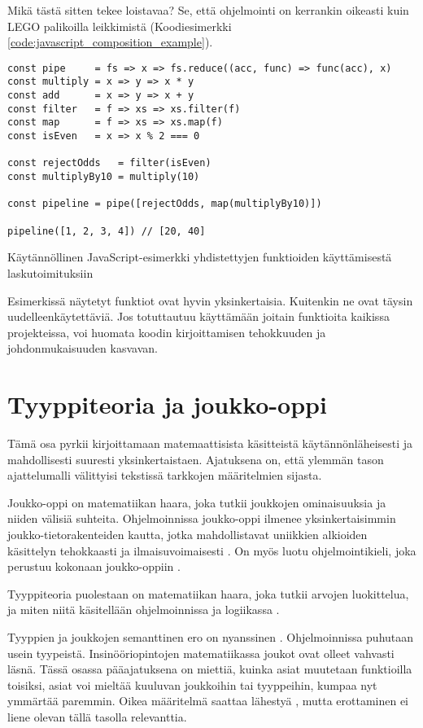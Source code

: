 Mikä tästä sitten tekee loistavaa? Se, että ohjelmointi on kerrankin oikeasti kuin LEGO palikoilla leikkimistä (Koodiesimerkki \ref{code:javascript_composition_example}).

\begin{code}
    \begin{verbatim}
const pipe     = fs => x => fs.reduce((acc, func) => func(acc), x)
const multiply = x => y => x * y
const add      = x => y => x + y
const filter   = f => xs => xs.filter(f)
const map      = f => xs => xs.map(f)
const isEven   = x => x % 2 === 0

const rejectOdds   = filter(isEven)
const multiplyBy10 = multiply(10)

const pipeline = pipe([rejectOdds, map(multiplyBy10)])

pipeline([1, 2, 3, 4]) // [20, 40]
\end{verbatim}
    \caption{Käytännöllinen JavaScript-esimerkki yhdistettyjen funktioiden käyttämisestä laskutoimituksiin}
    \label{code:javascript_composition_example}
\end{code}

Esimerkissä näytetyt funktiot ovat hyvin yksinkertaisia. Kuitenkin ne ovat täysin uudelleenkäytettäviä. Jos totuttautuu käyttämään joitain funktioita kaikissa projekteissa, voi huomata koodin kirjoittamisen tehokkuuden ja johdonmukaisuuden kasvavan.

\section{Tyyppiteoria ja joukko-oppi}
Tämä osa pyrkii kirjoittamaan matemaattisista käsitteistä käytännönläheisesti ja mahdollisesti suuresti yksinkertaistaen. Ajatuksena on, että ylemmän tason ajattelumalli välittyisi tekstissä tarkkojen määritelmien sijasta.

Joukko-oppi on matematiikan haara, joka tutkii joukkojen ominaisuuksia ja niiden välisiä suhteita. Ohjelmoinnissa joukko-oppi ilmenee yksinkertaisimmin joukko-tietorakenteiden kautta, jotka mahdollistavat uniikkien alkioiden käsittelyn tehokkaasti ja ilmaisuvoimaisesti \cite{mdn_set,mdn_set_methods}. On myös luotu ohjelmointikieli, joka perustuu kokonaan joukko-oppiin \cite{SETL_SET_LANGUAGE}.

Tyyppiteoria puolestaan on matematiikan haara, joka tutkii arvojen luokittelua, ja miten niitä käsitellään ohjelmoinnissa ja logiikassa \cite{type_theory,algebraic_data_types}.

Tyyppien ja joukkojen semanttinen ero on nyanssinen \cite{type_vs_set}. Ohjelmoinnissa puhutaan usein tyypeistä. Insinööriopintojen matematiikassa joukot ovat olleet vahvasti läsnä. Tässä osassa pääajatuksena on miettiä, kuinka asiat muutetaan funktioilla toisiksi, asiat voi mieltää kuuluvan joukkoihin tai tyyppeihin, kumpaa nyt ymmärtää paremmin. Oikea määritelmä saattaa lähestyä , mutta erottaminen ei liene olevan tällä tasolla relevanttia.

